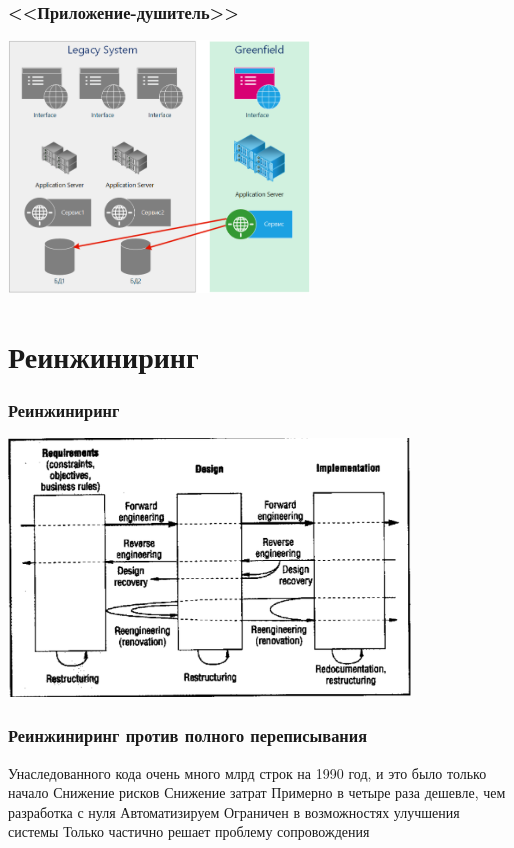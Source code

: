 \documentclass{../../slides-style}
\begin{document}
    \begin{frame}
        \frametitle{<<Приложение-душитель>>}
        \begin{center}
            \includegraphics[width=0.6\textwidth]{stranglerApp.png}
        \end{center}
    \end{frame}

    \section{Реинжиниринг}

    \begin{frame}
        \frametitle{Реинжиниринг}
        \begin{center}
            \includegraphics[width=0.8\textwidth]{reengineering.png}
        \end{center}
    \end{frame}

    \begin{frame}
        \frametitle{Реинжиниринг против полного переписывания}
        \begin{outline}
            \1 Унаследованного кода очень много
                 млрд строк на 1990 год, и это было только начало
            \1 Снижение рисков
            \1 Снижение затрат
                \2 Примерно в четыре раза дешевле, чем разработка с нуля
                \2 Автоматизируем
            \1 Ограничен в возможностях улучшения системы
                \2 Только частично решает проблему сопровождения
        \end{outline}
    \end{frame}
\end{document}
